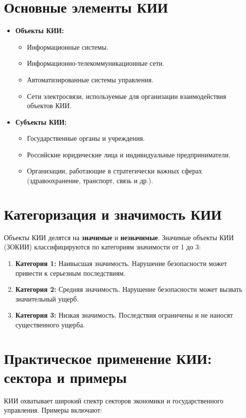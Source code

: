 \documentclass[a4paper, 14pt]{report}
\begin{document}
\section{Основные элементы КИИ}
\begin{itemize}
    \item \textbf{Объекты КИИ:}
          \begin{itemize}
              \item Информационные системы.
              \item Информационно-телекоммуникационные сети.
              \item Автоматизированные системы управления.
              \item Сети электросвязи, используемые для организации взаимодействия объектов КИИ.
          \end{itemize}
    \item \textbf{Субъекты КИИ:}
          \begin{itemize}
              \item Государственные органы и учреждения.
              \item Российские юридические лица и индивидуальные предприниматели.
              \item Организации, работающие в стратегически важных сферах (здравоохранение, транспорт, связь и др.).
          \end{itemize}
\end{itemize}

\section{Категоризация и значимость КИИ}
Объекты КИИ делятся на \textbf{значимые} и \textbf{незначимые}. Значимые объекты КИИ (ЗОКИИ) классифицируются по категориям значимости от 1 до 3:

\begin{enumerate}
    \item \textbf{Категория 1:} Наивысшая значимость. Нарушение безопасности может привести к серьезным последствиям.
    \item \textbf{Категория 2:} Средняя значимость. Нарушение безопасности может вызвать значительный ущерб.
    \item \textbf{Категория 3:} Низкая значимость. Последствия ограничены и не наносят существенного ущерба.
\end{enumerate}

\section{Практическое применение КИИ: сектора и примеры}
КИИ охватывает широкий спектр секторов экономики и государственного управления. Примеры включают:
\end{document}
